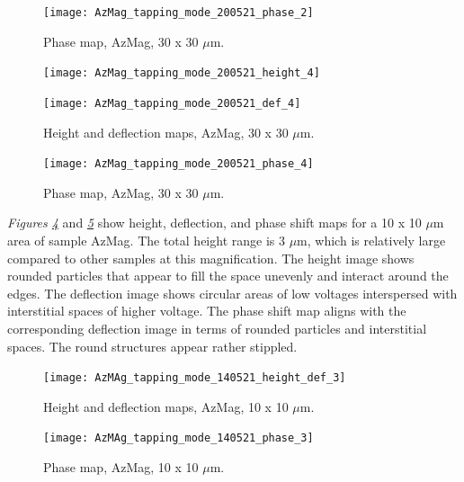 \begin{figure}[H]
\centering
  \texttt{[image: AzMag\_tapping\_mode\_200521\_phase\_2]}
\caption[Phase map, AzMag]{Phase map, AzMag, 30 x 30 $\mu$m.}
\label{fig:afm_azmag_phase_7}
\end{figure}


\begin{figure}[H]
\centering
\begin{minipage}{.45\textwidth}
  \centering
  \texttt{[image: AzMag\_tapping\_mode\_200521\_height\_4]}
\end{minipage}
\begin{minipage}{.45\textwidth}
  \centering
  \texttt{[image: AzMag\_tapping\_mode\_200521\_def\_4]}
\end{minipage}
\caption[Height and deflection maps, AzMag]{Height and deflection maps, AzMag, 30 x 30 $\mu$m.}
\label{fig:afm_azmag_height_def_8}
\end{figure}

\begin{figure}[H]
\centering
  \texttt{[image: AzMag\_tapping\_mode\_200521\_phase\_4]}
\caption[Phase map, AzMag]{Phase map, AzMag, 30 x 30 $\mu$m.}
\label{fig:afm_azmag_phase_8}
\end{figure}

\textit{Figures \ref{fig:afm_azmag_height_def_9}} and \textit{\ref{fig:afm_azmag_phase_9}} show height, deflection, and phase shift maps for a 10 x 10 $\mu$m area of sample AzMag. The total height range is 3 $\mu$m, which is relatively large compared to other samples at this magnification. The height image shows rounded particles that appear to fill the space unevenly and interact around the edges. The deflection image shows circular areas of low voltages interspersed with interstitial spaces of higher voltage. The phase shift map aligns with the corresponding deflection image in terms of rounded particles and interstitial spaces. The round structures appear rather stippled.

\begin{figure}[H]
\centering
  \texttt{[image: AzMAg\_tapping\_mode\_140521\_height\_def\_3]}
\caption[Height and deflection maps, AzMag]{Height and deflection maps, AzMag, 10 x 10 $\mu$m.}
\label{fig:afm_azmag_height_def_9}
\end{figure}

\begin{figure}[H]
\centering
  \texttt{[image: AzMAg\_tapping\_mode\_140521\_phase\_3]}
\caption[Phase map, AzMag]{Phase map, AzMag, 10 x 10 $\mu$m.}
\label{fig:afm_azmag_phase_9}
\end{figure}



